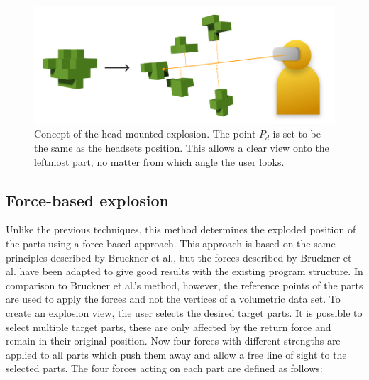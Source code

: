 \begin{figure}[h]
	\centering
	\includegraphics[width=.65\linewidth]{fig/Images/LineExplosionHeadMounted}
	\caption[]{Concept of the head-mounted explosion. The point $P_d$ is set to be the same as the headsets position. This allows a clear view onto the leftmost part, no matter from which angle the user looks. }
	\label{fig:headExpl}
\end{figure}

\subsection{Force-based explosion}
Unlike the previous techniques, this method determines the exploded position of the parts using a force-based approach.
This approach is based on the same principles described by Bruckner et al., but the forces described by Bruckner et al. have been adapted to give good results with the existing program structure.\cite{Bruckner_2006}
In comparison to Bruckner et al.'s method, however, the reference points of the parts are used to apply the forces and not the vertices of a volumetric data set.
To create an explosion view, the user selects the desired target parts. 
It is possible to select multiple target parts, these are only affected by the return force and remain in their original position.
Now four forces with different strengths are applied to all parts which push them away and allow a free line of sight to the selected parts.
The four forces acting on each part are defined as follows:
